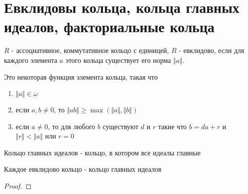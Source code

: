 \documentclass[../main/document.tex]{subfiles}
\begin{document}
\section{Евклидовы кольца, кольца главных идеалов, факториальные кольца}
\begin{dfn}\label{euclidean-ring}
$R$ - ассоциативное, коммутативное кольцо с единицей, $R$ - евклидово, если для каждого элемента $a$ этого кольца существует его норма $\Vert a\Vert$.
\end{dfn}
\begin{dfn}\label{euclidean-norm}
Это некоторая функция элемента кольца, такая что
\begin{enumerate}
\item $\Vert a\Vert \in \omega$
\item если $a,b\neq 0$, то $\Vert ab\Vert \geq \max(\Vert a\Vert,\Vert b\Vert)$
\item если $a\neq 0$, то для любого $b$ существуют $d$ и $r$ такие что $b=da+r$ и $\Vert r\Vert < \Vert a\Vert$ или $r=0$
\end{enumerate}
\end{dfn}
\begin{dfn}
Кольцо главных идеалов - кольцо, в котором все идеалы главные
\end{dfn}
\begin{thm}
Каждое евклидово кольцо - кольцо главных идеалов
\begin{proof}

\end{proof}
\end{thm}
\end{document}
